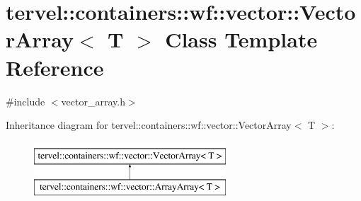 \hypertarget{classtervel_1_1containers_1_1wf_1_1vector_1_1_vector_array}{}\section{tervel\+:\+:containers\+:\+:wf\+:\+:vector\+:\+:Vector\+Array$<$ T $>$ Class Template Reference}
\label{classtervel_1_1containers_1_1wf_1_1vector_1_1_vector_array}


{\ttfamily \#include $<$vector\+\_\+array.\+h$>$}

Inheritance diagram for tervel\+:\+:containers\+:\+:wf\+:\+:vector\+:\+:Vector\+Array$<$ T $>$\+:\begin{figure}[H]
\begin{center}
\leavevmode
\includegraphics[height=2.000000cm]{classtervel_1_1containers_1_1wf_1_1vector_1_1_vector_array}
\end{center}
\end{figure}
